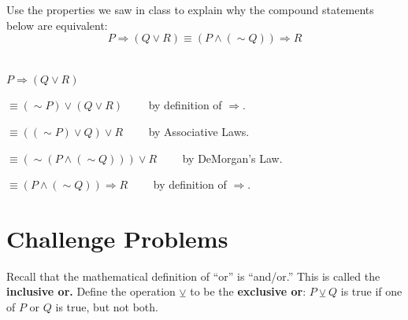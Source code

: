 \documentclass[12 pt]{exam}
\begin{document}
\begin{questions}



\question Use the properties we saw in class to explain why the compound statements below are equivalent:
$$P \Rightarrow (Q \vee R) \equiv (P \wedge (\sim Q)) \Rightarrow R$$
\begin{solution}\\
$P \Rightarrow (Q \vee R)$

$\equiv (\sim P) \vee (Q \vee R) \qquad$ by definition of $\Rightarrow$.

$\equiv ((\sim P) \vee Q) \vee R \qquad$ by Associative Laws.

$\equiv (\sim (P \wedge (\sim Q))) \vee R \qquad$  by DeMorgan's Law.

$\equiv (P \wedge (\sim Q)) \Rightarrow R \qquad$ by definition of $\Rightarrow$.
\end{solution}


\newpage
\section*{Challenge Problems}
\question Recall that the mathematical definition of ``or'' is ``and/or.'' This is called the {\bf inclusive or.} Define the operation $\veebar$ to be the {\bf exclusive or}: $P \veebar Q$ is true if one of $P$ or $Q$ is true, but not both.

\end{questions}
\end{document}
